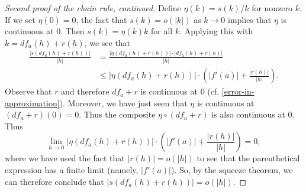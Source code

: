 \begin{proof}[Second proof of the chain rule, continued]
	Define $\eta(k) = s(k)/k$ for nonzero $k$. If we set $\eta(0) = 0$, the fact that $s(k) = o(|k|)$ as $k \to 0$ implies that $\eta$ is continuous at 0. Then $s(k) = \eta(k)k$ for all $k$. Applying this with $k = df_a(h) + r(h)$, we see that
	\[ \begin{aligned} \frac{|s(df_a(h)+r(h))|}{|h|} &= \frac{|\eta(df_a(h)+r(h))| \cdot |df_a(h)+r(h)|}{|h|} \\
	&\leq |\eta(df_a(h)+r(h))| \cdot \left( |f'(a)| + \frac{|r(h)|}{|h|} \right). \end{aligned} \]
	Observe that $r$ and therefore $df_a + r$ is continuous at $0$ (cf. \cref{error-in-approximation}). Moreover, we have just seen that $\eta$ is continuous at $(df_a + r)(0) = 0$. Thus the composite $\eta \circ (df_a + r)$ is also continuous at 0. Thus
	\[ \lim_{h \to 0} |\eta(df_a(h)+r(h))| \cdot \left( |f'(a)| + \frac{|r(h)|}{|h|} \right) = 0, \]
	where we have used the fact that $|r(h)| = o(|h|)$ to see that the parenthetical expression has a finite limit (namely, $|f'(a)|$). So, by the squeeze theorem, we can therefore conclude that $|s(df_a(h)+r(h))| = o(|h|)$.  
\end{proof}

